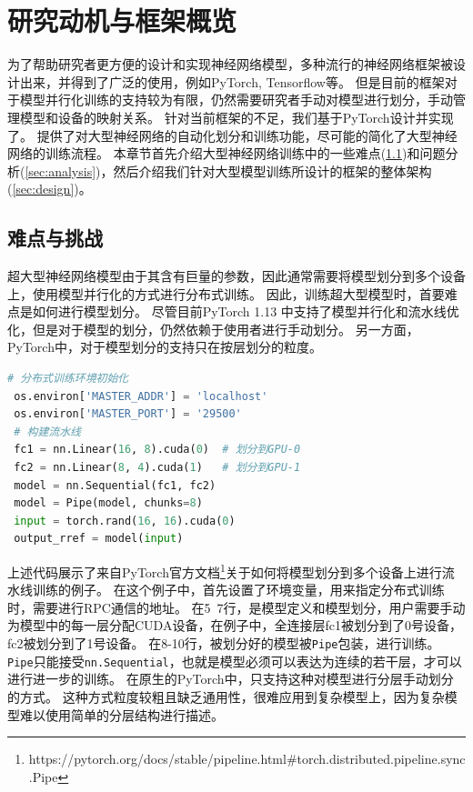 \chapter{研究动机与框架概览}
\label{chapter:analysis}

为了帮助研究者更方便的设计和实现神经网络模型，多种流行的神经网络框架被设计出来，并得到了广泛的使用，例如PyTorch, Tensorflow等。
但是目前的框架对于模型并行化训练的支持较为有限，仍然需要研究者手动对模型进行划分，手动管理模型和设备的映射关系。
针对当前框架的不足，我们基于PyTorch设计并实现了\sys{}。
\sys{}提供了对大型神经网络的自动化划分和训练功能，尽可能的简化了大型神经网络的训练流程。
本章节首先介绍大型神经网络训练中的一些难点(\ref{sec:difficulties})和问题分析(\ref{sec:analysis})，然后介绍我们针对大型模型训练所设计的\sys{}框架的整体架构(\ref{sec:design})。

\section{难点与挑战}
\label{sec:difficulties}

超大型神经网络模型由于其含有巨量的参数，因此通常需要将模型划分到多个设备上，使用模型并行化的方式进行分布式训练。
因此，训练超大型模型时，首要难点是如何进行模型划分。
尽管目前PyTorch 1.13 中支持了模型并行化和流水线优化，但是对于模型的划分，仍然依赖于使用者进行手动划分。
另一方面，PyTorch中，对于模型划分的支持只在按层划分的粒度。
\begin{lstlisting}[language=Python, caption={PyTorch 1.13中的流水线并行化}]
 # 分布式训练环境初始化
 os.environ['MASTER_ADDR'] = 'localhost'
 os.environ['MASTER_PORT'] = '29500'
 # 构建流水线
 fc1 = nn.Linear(16, 8).cuda(0)  # 划分到GPU-0
 fc2 = nn.Linear(8, 4).cuda(1)   # 划分到GPU-1
 model = nn.Sequential(fc1, fc2)
 model = Pipe(model, chunks=8)
 input = torch.rand(16, 16).cuda(0)
 output_rref = model(input)
\end{lstlisting}


上述代码展示了来自PyTorch官方文档\footnote[1]{https://pytorch.org/docs/stable/pipeline.html\#torch.distributed.pipeline.sync.Pipe}关于如何将模型划分到多个设备上进行流水线训练的例子。
在这个例子中，首先设置了环境变量，用来指定分布式训练时，需要进行RPC通信的地址。
在5~7行，是模型定义和模型划分，用户需要手动为模型中的每一层分配CUDA设备，在例子中，全连接层fc1被划分到了0号设备，fc2被划分到了1号设备。
在8-10行，被划分好的模型被\texttt{Pipe}包装，进行训练。
\texttt{Pipe}只能接受\texttt{nn.Sequential}，也就是模型必须可以表达为连续的若干层，才可以进行进一步的训练。
在原生的PyTorch中，只支持这种对模型进行分层手动划分的方式。
这种方式粒度较粗且缺乏通用性，很难应用到复杂模型上，因为复杂模型难以使用简单的分层结构进行描述。

